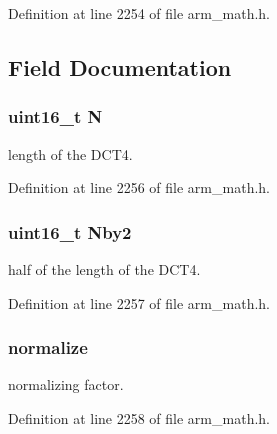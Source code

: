 Definition at line 2254 of file arm\+\_\+math.\+h.



\subsection{Field Documentation}
\subsubsection[{\texorpdfstring{N}{N}}]{\setlength{\rightskip}{0pt plus 5cm}uint16\+\_\+t N}\hypertarget{structarm__dct4__instance__f32_a37d49571fe35012087153c093705cd11}{}\label{structarm__dct4__instance__f32_a37d49571fe35012087153c093705cd11}
length of the D\+C\+T4. 

Definition at line 2256 of file arm\+\_\+math.\+h.

\subsubsection[{\texorpdfstring{Nby2}{Nby2}}]{\setlength{\rightskip}{0pt plus 5cm}uint16\+\_\+t Nby2}\hypertarget{structarm__dct4__instance__f32_afa64b1618089e35c2b55cff71cb29715}{}\label{structarm__dct4__instance__f32_afa64b1618089e35c2b55cff71cb29715}
half of the length of the D\+C\+T4. 

Definition at line 2257 of file arm\+\_\+math.\+h.

\subsubsection[{\texorpdfstring{normalize}{normalize}}]{ normalize}\hypertarget{structarm__dct4__instance__f32_a1bf2ed86ef2c3dd83af606bb3f520f2a}{}\label{structarm__dct4__instance__f32_a1bf2ed86ef2c3dd83af606bb3f520f2a}
normalizing factor. 

Definition at line 2258 of file arm\+\_\+math.\+h.

